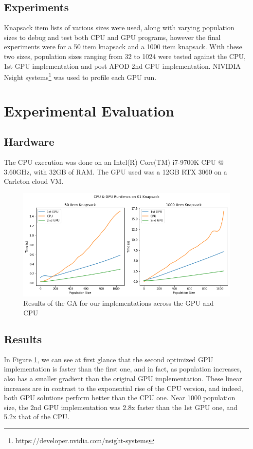 \documentclass[11pt]{article}       %
\begin{document}
\subsection{Experiments}
Knapsack item lists of various sizes were used, along with varying population sizes to debug and test both CPU and GPU programs, however the final experiments were for a 50 item knapsack and a 1000 item knapsack. With these two sizes, population sizes ranging from 32 to 1024 were tested against the CPU, 1st GPU implementation and post APOD 2nd GPU implementation.
NIVIDIA Nsight systems\footnote{https://developer.nvidia.com/nsight-systems} was used to profile each GPU run.

\section{Experimental Evaluation} \label{expeval}

\subsection{Hardware}
The CPU execution was done on an Intel(R) Core(TM) i7-9700K CPU @ 3.60GHz, with 32GB of RAM. The GPU used was a 12GB RTX 3060 on a Carleton cloud VM.

\begin{figure}[h]
    \centering
    \includegraphics[width=\linewidth]{Figures/cpu_gpu_runtimes.png}
    \caption{Results of the GA for our implementations across the GPU and CPU}
    \label{fig:runtime}
\end{figure}

\subsection{Results}
In Figure \ref{fig:runtime}, we can see at first glance that the second optimized GPU implementation is faster than the first one, and in fact, as population increases, also has a smaller gradient than the original GPU implementation. These linear increases are in contrast to the exponential rise of the CPU version, and indeed, both GPU solutions perform better than the CPU one. Near 1000 population size, the 2nd GPU implementation was 2.8x faster than the 1st GPU one, and 5.2x that of the CPU.
\end{document}
